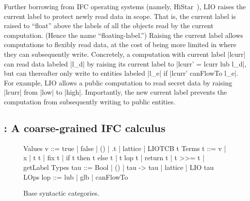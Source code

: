 
Further borrowing from IFC operating systems (namely,
HiStar~\cite{zeldovich:histar}), LIO raises the current label to
protect newly read data in scope.
%
That is, the current label is raised to ``float'' above the labels of
all the objects read by the current computation.
(Hence the name ``floating-label.'')
% 
Raising the current label allows computations to flexibly read data,
at the cost of being more limited in where they can subsequently
write.
%
Concretely, a computation with current label |lcurr| can read data
labeled |l_d| by raising its current label to |lcurr' = lcurr lub
l_d|, but can thereafter only write to entities labeled |l_e| if
|lcurr' canFlowTo l_e|.
%
For example, LIO allows a public computation to read secret data by
raising |lcurr| from |low| to |high|. Importantly, the new current label
prevents the computation from subsequently writing to public entities.


\subsection{\lio: A coarse-grained IFC calculus}
 

\begin{figure}[t]
\small
\centering
\begin{code}
Values  v    ::=  true | false | () | \x.t | lattice | LIOTCB t
Terms   t    ::=  v | x | t t | fix t | if t then t else t
               |  t lop t | return t | t >>= t | getLabel
Types   tau  ::=  Bool | () | tau -> tau | lattice | LIO tau  
LOps    lop  ::=  lub | glb | canFlowTo
\end{code}
\caption{\label{fig:sos:base}
          Base \lio{} syntactic categories.}
\end{figure}

